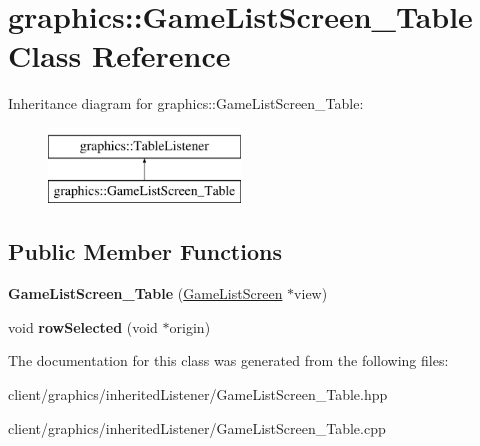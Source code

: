 \hypertarget{classgraphics_1_1_game_list_screen___table}{\section{graphics\-:\-:Game\-List\-Screen\-\_\-\-Table Class Reference}
\label{classgraphics_1_1_game_list_screen___table}
}
Inheritance diagram for graphics\-:\-:Game\-List\-Screen\-\_\-\-Table\-:\begin{figure}[H]
\begin{center}
\leavevmode
\includegraphics[height=2.000000cm]{classgraphics_1_1_game_list_screen___table}
\end{center}
\end{figure}
\subsection*{Public Member Functions}
\begin{DoxyCompactItemize}
\item 
\hypertarget{classgraphics_1_1_game_list_screen___table_afbd609ede2c7259bee87eb97c80f57b6}{{\bfseries Game\-List\-Screen\-\_\-\-Table} (\hyperlink{classgraphics_1_1_game_list_screen}{Game\-List\-Screen} $\ast$view)}\label{classgraphics_1_1_game_list_screen___table_afbd609ede2c7259bee87eb97c80f57b6}

\item 
\hypertarget{classgraphics_1_1_game_list_screen___table_afa44b7ce8f1805e3132646fe4a6f665d}{void {\bfseries row\-Selected} (void $\ast$origin)}\label{classgraphics_1_1_game_list_screen___table_afa44b7ce8f1805e3132646fe4a6f665d}

\end{DoxyCompactItemize}


The documentation for this class was generated from the following files\-:\begin{DoxyCompactItemize}
\item 
client/graphics/inherited\-Listener/Game\-List\-Screen\-\_\-\-Table.\-hpp\item 
client/graphics/inherited\-Listener/Game\-List\-Screen\-\_\-\-Table.\-cpp\end{DoxyCompactItemize}
